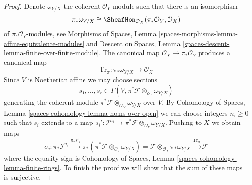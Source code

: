 \begin{proof}
Denote $\omega_{Y/X}$ the coherent $\mathcal{O}_Y$-module such that there
is an isomorphism
$$
\pi_*\omega_{Y/X} \cong
\SheafHom_{\mathcal{O}_X}(\pi_*\mathcal{O}_Y, \mathcal{O}_X)
$$
of $\pi_*\mathcal{O}_Y$-modules, see Morphisms of Spaces, Lemma
\ref{spaces-morphisms-lemma-affine-equivalence-modules} and
Descent on Spaces, Lemma \ref{spaces-descent-lemma-finite-over-finite-module}.
The canonical map $\mathcal{O}_X \to \pi_*\mathcal{O}_Y$
produces a canonical map
$$
\text{Tr}_\pi : \pi_*\omega_{Y/X} \longrightarrow \mathcal{O}_X
$$
Since $V$ is Noetherian affine we may choose sections
$$
s_1, \ldots, s_r \in
\Gamma(V, \pi^*\mathcal{F} \otimes_{\mathcal{O}_Y} \omega_{Y/X})
$$
generating the coherent module
$\pi^*\mathcal{F} \otimes_{\mathcal{O}_X} \omega_{Y/X}$
over $V$. By
Cohomology of Spaces, Lemma \ref{spaces-cohomology-lemma-homs-over-open}
we can choose integers $n_i \geq 0$ such that $s_i$
extends to a map
$s_i' : \mathcal{I}^{n_i} \to
\pi^*\mathcal{F} \otimes_{\mathcal{O}_Y} \omega_{Y/X}$.
Pushing to $X$ we obtain maps
$$
\sigma_i :
\pi_*\mathcal{I}^{n_i}
\xrightarrow{\pi_*s'_i}
\pi_*(\pi^*\mathcal{F} \otimes_{\mathcal{O}_Y} \omega_{Y/X}) =
\mathcal{F} \otimes_{\mathcal{O}_X} \pi_*\omega_{Y/X}
\xrightarrow{\text{Tr}_\pi} \mathcal{F}
$$
where the equality sign is
Cohomology of Spaces, Lemma \ref{spaces-cohomology-lemma-finite-rings}.
To finish the proof we will show that the sum of these maps is surjective.


\end{proof}
